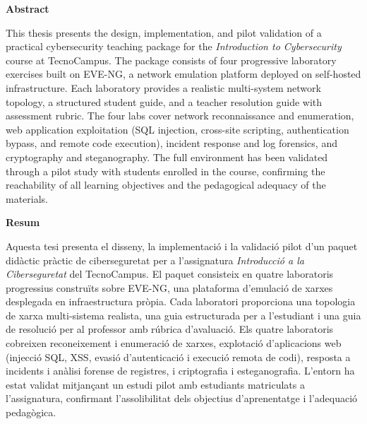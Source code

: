 \thispagestyle{plain}

\begin{small}

\noindent\textbf{Abstract}

\smallskip
\noindent This thesis presents the design, implementation, and pilot validation of a
practical cybersecurity teaching package for the \textit{Introduction to
Cybersecurity} course at TecnoCampus. The package consists of four progressive
laboratory exercises built on EVE-NG, a network emulation platform deployed on
self-hosted infrastructure. Each laboratory provides a realistic multi-system
network topology, a structured student guide, and a teacher resolution guide with
assessment rubric. The four labs cover network reconnaissance and enumeration,
web application exploitation (SQL injection, cross-site scripting, authentication
bypass, and remote code execution), incident response and log forensics, and
cryptography and steganography. The full environment has been validated through a
pilot study with students enrolled in the course, confirming the reachability of
all learning objectives and the pedagogical adequacy of the materials.

\bigskip
\noindent\textbf{Resum}

\smallskip
\noindent Aquesta tesi presenta el disseny, la implementació i la validació pilot d'un paquet
didàctic pràctic de ciberseguretat per a l'assignatura \textit{Introducció a la
Ciberseguretat} del TecnoCampus. El paquet consisteix en quatre laboratoris
progressius construïts sobre EVE-NG, una plataforma d'emulació de xarxes desplegada
en infraestructura pròpia. Cada laboratori proporciona una topologia de xarxa
multi-sistema realista, una guia estructurada per a l'estudiant i una guia de
resolució per al professor amb rúbrica d'avaluació. Els quatre laboratoris cobreixen
reconeixement i enumeració de xarxes, explotació d'aplicacions web (injecció SQL,
XSS, evasió d'autenticació i execució remota de codi), resposta a incidents i
anàlisi forense de registres, i criptografia i esteganografia. L'entorn ha estat
validat mitjançant un estudi pilot amb estudiants matriculats a l'assignatura,
confirmant l'assolibilitat dels objectius d'aprenentatge i l'adequació pedagògica.

\end{small}
